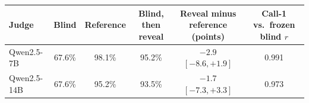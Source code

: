 \begin{tabular}{lccccc}
\toprule
Judge & Blind & Reference & Blind, then reveal & Reveal minus reference (points) & Call-1 vs.\ frozen blind $r$ \\
\midrule
Qwen2.5-7B & 67.6\% & 98.1\% & 95.2\% & $-2.9$ {\scriptsize$[-8.6,+1.9]$} & 0.991 \\
Qwen2.5-14B & 67.6\% & 95.2\% & 93.5\% & $-1.7$ {\scriptsize$[-7.3,+3.3]$} & 0.973 \\
\bottomrule
\end{tabular}

